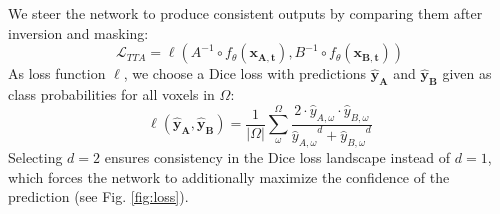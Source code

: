     We steer the network to produce consistent outputs by comparing them after inversion and masking:
    \begin{equation}
        \mathcal{L}_{TTA} = \ell\left(A^{-1} \circ f_\theta\left(\mathbf{x_{A,t}}\right), B^{-1} \circ f_\theta\left(\mathbf{x_{B,t}}\right)\right)
    \end{equation}
    As loss function $\ell$, we choose a Dice loss with predictions $\mathbf{\hat{y}_A}$ and $\mathbf{\hat{y}_B}$ given as class probabilities for all voxels in $\Omega$:
    \begin{equation}
        \ell(\mathbf{\hat{y}_A}, \mathbf{\hat{y}_B}) = \frac{1}{\lvert\Omega\rvert}\sum_{\omega}^{\Omega} \frac{2 \cdot \hat{y}_{A,\omega} \cdot \hat{y}_{B,\omega}}{{\hat{y}_{A,\omega}}^d + {\hat{y}_{B,\omega}}^d}
        \label{eq:losstta}
    \end{equation}
    Selecting $d=2$ ensures consistency in the Dice loss landscape instead of $d=1$, which forces the network to additionally maximize the confidence of the prediction (see Fig. \ref{fig:loss}).

